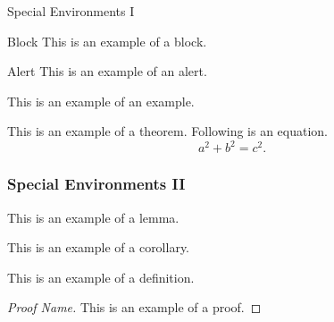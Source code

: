 \begin{frame}{Special Environments I}
    \begin{block}{Block}
        This is an example of a block.
    \end{block}
    \begin{alertblock}{Alert}
        This is an example of an alert.
    \end{alertblock}
    \begin{example}
        This is an example of an example.
    \end{example}
    \begin{theorem}
        This is an example of a theorem. Following is an equation.
        \begin{equation*}
            a^2 + b^2 = c^2.
        \end{equation*}
    \end{theorem}
\end{frame}

\begin{frame}
    \frametitle{Special Environments II}
    \begin{lemma}
    This is an example of a lemma.
    \end{lemma}
    \begin{corollary}
        This is an example of a corollary.
    \end{corollary}
    \begin{definition}
        This is an example of a definition.
    \end{definition}
    \begin{proof}[Proof Name]
        This is an example of a proof.
    \end{proof}
\end{frame}